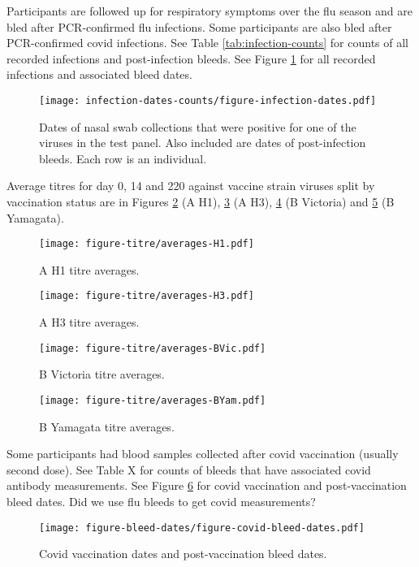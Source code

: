 \documentclass[12pt]{article}
\begin{document}
Participants are followed up for respiratory symptoms over the flu season and are bled after PCR-confirmed flu infections. Some participants are also bled after PCR-confirmed covid infections.
See Table \ref{tab:infection-counts} for counts of all recorded infections and post-infection bleeds.
See Figure \ref{fig:postinf-bleed-dates} for all recorded infections and associated bleed dates.



\begin{figure}
	\texttt{[image: infection-dates-counts/figure-infection-dates.pdf]}
	\caption{Dates of nasal swab collections that were positive for one of the viruses in the test panel. Also included are dates of post-infection bleeds. Each row is an individual.}
	\label{fig:postinf-bleed-dates}
\end{figure}

Average titres for day 0, 14 and 220 against vaccine strain viruses split by vaccination status are in Figures \ref{fig:titre-averages-H1} (A H1), \ref{fig:titre-averages-H3} (A H3), \ref{fig:titre-averages-BVic} (B Victoria) and \ref{fig:titre-averages-BYam} (B Yamagata).

\begin{figure}
	\texttt{[image: figure-titre/averages-H1.pdf]}
	\caption{A H1 titre averages.}
	\label{fig:titre-averages-H1}
\end{figure}

\begin{figure}
	\texttt{[image: figure-titre/averages-H3.pdf]}
	\caption{A H3 titre averages.}
	\label{fig:titre-averages-H3}
\end{figure}

\begin{figure}
	\texttt{[image: figure-titre/averages-BVic.pdf]}
	\caption{B Victoria titre averages.}
	\label{fig:titre-averages-BVic}
\end{figure}

\begin{figure}
	\texttt{[image: figure-titre/averages-BYam.pdf]}
	\caption{B Yamagata titre averages.}
	\label{fig:titre-averages-BYam}
\end{figure}

Some participants had blood samples collected after covid vaccination (usually second dose).
See Table X for counts of bleeds that have associated covid antibody measurements.
See Figure \ref{fig:covid-vax-bleed-dates} for covid vaccination and post-vaccination bleed dates.
Did we use flu bleeds to get covid measurements?

\begin{figure}
	\texttt{[image: figure-bleed-dates/figure-covid-bleed-dates.pdf]}
	\caption{Covid vaccination dates and post-vaccination bleed dates.}
	\label{fig:covid-vax-bleed-dates}
\end{figure}
\end{document}
